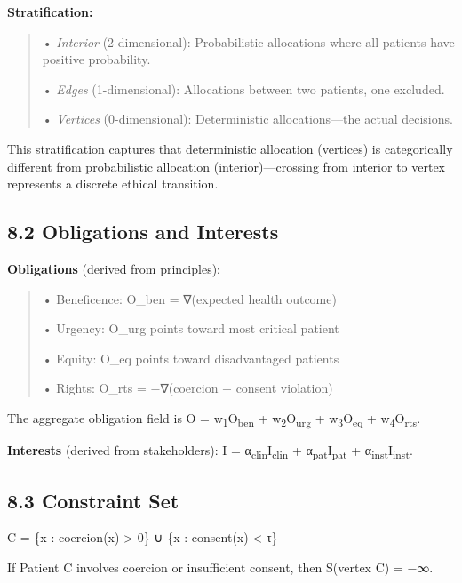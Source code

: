 \documentclass[12pt]{article}
\theoremstyle{plain}
\theoremstyle{definition}
\theoremstyle{remark}
\begin{document}
\textbf{Stratification:}

\begin{quote}
• \emph{Interior} (2-dimensional): Probabilistic allocations where all
patients have positive probability.

• \emph{Edges} (1-dimensional): Allocations between two patients, one
excluded.

• \emph{Vertices} (0-dimensional): Deterministic allocations---the
actual decisions.
\end{quote}

This stratification captures that deterministic allocation (vertices) is
categorically different from probabilistic allocation
(interior)---crossing from interior to vertex represents a discrete
ethical transition.

\subsection{8.2 Obligations and
Interests}\label{obligations-and-interests}

\textbf{Obligations} (derived from principles):

\begin{quote}
• Beneficence: O\_ben = ∇(expected health outcome)

• Urgency: O\_urg points toward most critical patient

• Equity: O\_eq points toward disadvantaged patients

• Rights: O\_rts = −∇(coercion + consent violation)
\end{quote}

The aggregate obligation field is O =
w\textsubscript{1}O\textsubscript{ben} +
w\textsubscript{2}O\textsubscript{urg} +
w\textsubscript{3}O\textsubscript{eq} +
w\textsubscript{4}O\textsubscript{rts}.

\textbf{Interests} (derived from stakeholders): I =
α\textsubscript{clin}I\textsubscript{clin} +
α\textsubscript{pat}I\textsubscript{pat} +
α\textsubscript{inst}I\textsubscript{inst}.

\subsection{8.3 Constraint Set}\label{constraint-set}

C = \{x : coercion(x) \textgreater{} 0\} ∪ \{x : consent(x) \textless{}
τ\}

If Patient C involves coercion or insufficient consent, then S(vertex C)
= −∞.
\end{document}
